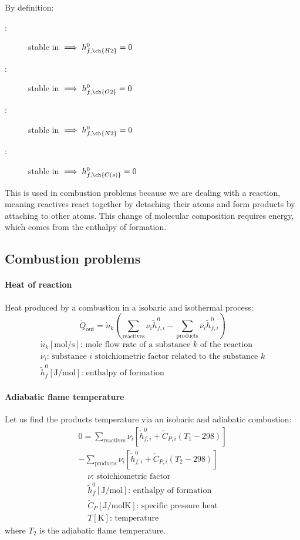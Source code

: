 \documentclass[10pt, twocolumn]{article}
\begin{document}
By definition:
\begin{description}
  \item[: ] stable in  \(\implies h^0_{f,\ch{H2}} = 0\)
  \item[: ] stable in  \(\implies h^0_{f,\ch{O2}} = 0\)
  \item[: ] stable in  \(\implies h^0_{f,\ch{N2}} = 0\)
  \item[: ] stable in  \(\implies h^0_{f,\ch{C(s)}} = 0\)
\end{description}

This is used in combustion problems because we are dealing with a reaction, meaning reactives react together by detaching their atoms and form products by attaching to other atoms.
This change of molecular composition requires energy, which comes from the enthalpy of formation.


\subsection{Combustion problems}
\paragraph{Heat of reaction}
Heat produced by a combustion in a isobaric and isothermal process:
\[
  \dot{Q}_\mathrm{out} = \dot{n}_k \left( \sum_\mathrm{reactives}{\nu_i \tilde{h}^0_{f,i}} - \sum_\mathrm{products}{\nu_i \tilde{h}^0_{f,i}} \right)
\]
\[
  \begin{array}{|l}
    \dot{n}_k [\si{\mole\per\second}] \text{: mole flow rate of a substance } k \text{ of the reaction} \\
    \nu_i \text{: substance } i \text{ stoichiometric factor related to the substance } k               \\
    \tilde{h}^0_f [\si{\joule\per\mole}] \text{: enthalpy of formation}
  \end{array}
\]

\paragraph{Adiabatic flame temperature}
Let us find the products temperature via an isobaric and adiabatic combustion:
\begin{multline}
  0 = \sum_\mathrm{reactives}{\nu_i \left[ \tilde{h}^0_{f,i} + \tilde{C}_{P,i}(T_1 - 298) \right]} \\
  - \sum_\mathrm{products}{\nu_i \left[ \tilde{h}^0_{f,i} + \tilde{C}_{P,i}(T_2 - 298) \right]}
\end{multline}
\[
  \begin{array}{|l}
    \nu \text{: stoichiometric factor}                                        \\
    \tilde{h}^0_f [\si{\joule\per\mole}] \text{: enthalpy of formation}       \\
    \tilde{C}_P [\si{\joule\per\mole\kelvin}] \text{: specific pressure heat} \\
    T [\si{\kelvin}] \text{: temperature}
  \end{array}
\]
where \(T_2\) is the adiabatic flame temperature.
\end{document}

